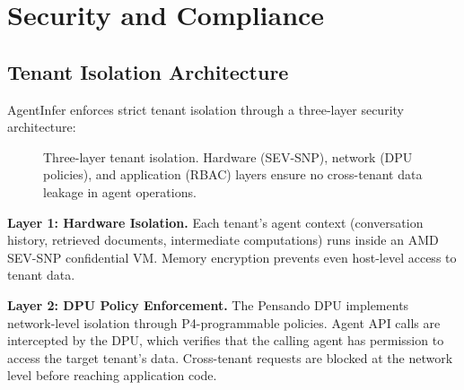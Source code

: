 \documentclass[conference,10pt,letterpaper]{IEEEtran}
\begin{document}
\section{Security and Compliance}
\label{sec:security}

\subsection{Tenant Isolation Architecture}

AgentInfer enforces strict tenant isolation through a three-layer security architecture:

\begin{figure}[!t]
\centering
{}
\caption{Three-layer tenant isolation. Hardware (SEV-SNP), network (DPU policies), and application (RBAC) layers ensure no cross-tenant data leakage in agent operations.}
\label{fig:security}
\end{figure}

\textbf{Layer 1: Hardware Isolation.} Each tenant's agent context (conversation history, retrieved documents, intermediate computations) runs inside an AMD SEV-SNP confidential VM. Memory encryption prevents even host-level access to tenant data.

\textbf{Layer 2: DPU Policy Enforcement.} The Pensando DPU implements network-level isolation through P4-programmable policies. Agent API calls are intercepted by the DPU, which verifies that the calling agent has permission to access the target tenant's data. Cross-tenant requests are blocked at the network level before reaching application code.
\end{document}
